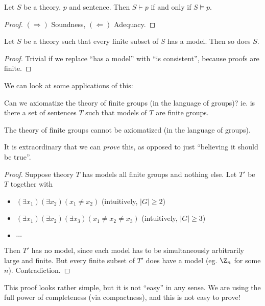 \documentclass[a4paper]{article}
\begin{document}
\begin{thm}
  Let $S$ be a theory, $p$ and sentence. Then $S\vdash p$ if and only if $S \models p$.
\end{thm}

\begin{proof}
  $(\Rightarrow)$ Soundness, $(\Leftarrow)$ Adequacy.
\end{proof}

\begin{cor}
  Let $S$ be a theory such that every finite subset of $S$ has a model. Then so does $S$.
\end{cor}

\begin{proof}
  Trivial if we replace ``has a model'' with ``is consistent'', because proofs are finite.
\end{proof}

We can look at some applications of this:

Can we axiomatize the theory of finite groups (in the language of groups)? ie. is there a set of sentences $T$ such that models of $T$ are finite groups.

\begin{cor}
  The theory of finite groups cannot be axiomatized (in the language of groups).
\end{cor}
It is extraordinary that we can \emph{prove} this, as opposed to just ``believing it should be true''.

\begin{proof}
  Suppose theory $T$ has models all finite groups and nothing else. Let $T'$ be $T$ together with
  \begin{itemize}
    \item $(\exists x_1)(\exists x_2)(x_1 \not = x_2)$ (intuitively, $|G| \geq 2$)
    \item $(\exists x_1)(\exists x_2)(\exists x_3)(x_1 \not= x_2 \not= x_3)$ (intuitively, $|G| \geq 3$)
    \item $\cdots$
  \end{itemize}
  Then $T'$ has no model, since each model has to be simultaneously arbitrarily large and finite. But every finite subset of $T'$ does have a model (eg. $\Z_n$ for some $n$). Contradiction.
\end{proof}
This proof looks rather simple, but it is not ``easy'' in any sense. We are using the full power of completeness (via compactness), and this is not easy to prove!
\end{document}
